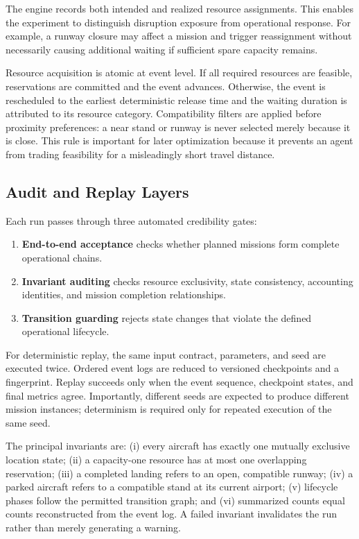 \documentclass[runningheads]{llncs}
\begin{document}
The engine records both intended and realized resource assignments. This enables the experiment to distinguish disruption exposure from operational response. For example, a runway closure may affect a mission and trigger reassignment without necessarily causing additional waiting if sufficient spare capacity remains.

Resource acquisition is atomic at event level. If all required resources are feasible, reservations are committed and the event advances. Otherwise, the event is rescheduled to the earliest deterministic release time and the waiting duration is attributed to its resource category. Compatibility filters are applied before proximity preferences: a near stand or runway is never selected merely because it is close. This rule is important for later optimization because it prevents an agent from trading feasibility for a misleadingly short travel distance.

\subsection{Audit and Replay Layers}
Each run passes through three automated credibility gates:
\begin{enumerate}
  \item \textbf{End-to-end acceptance} checks whether planned missions form complete operational chains.
  \item \textbf{Invariant auditing} checks resource exclusivity, state consistency, accounting identities, and mission completion relationships.
  \item \textbf{Transition guarding} rejects state changes that violate the defined operational lifecycle.
\end{enumerate}
For deterministic replay, the same input contract, parameters, and seed are executed twice. Ordered event logs are reduced to versioned checkpoints and a fingerprint. Replay succeeds only when the event sequence, checkpoint states, and final metrics agree. Importantly, different seeds are expected to produce different mission instances; determinism is required only for repeated execution of the same seed.

The principal invariants are: (i) every aircraft has exactly one mutually exclusive location state; (ii) a capacity-one resource has at most one overlapping reservation; (iii) a completed landing refers to an open, compatible runway; (iv) a parked aircraft refers to a compatible stand at its current airport; (v) lifecycle phases follow the permitted transition graph; and (vi) summarized counts equal counts reconstructed from the event log. A failed invariant invalidates the run rather than merely generating a warning.
\end{document}
